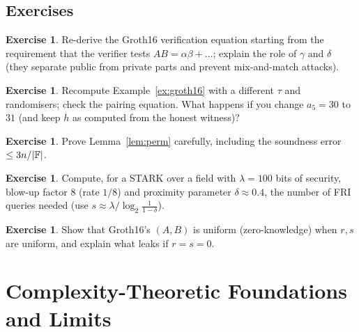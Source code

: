 \documentclass[11pt,a4paper]{report}
\theoremstyle{plain}
\theoremstyle{definition}
\newtheorem{exercise}[theorem]{Exercise}
\theoremstyle{remark}
\begin{document}
\section*{Exercises}
\begin{exercise}
Re-derive the Groth16 verification equation starting from the requirement that the verifier tests $AB=\alpha\beta+\ldots$; explain the role of $\gamma$ and $\delta$ (they separate public from private parts and prevent mix-and-match attacks).
\end{exercise}
\begin{exercise}
Recompute Example~\ref{ex:groth16} with a different $\tau$ and randomisers; check the pairing equation. What happens if you change $a_5=30$ to $31$ (and keep $h$ as computed from the honest witness)?
\end{exercise}
\begin{exercise}
Prove Lemma~\ref{lem:perm} carefully, including the soundness error $\le 3n/|\mathbb{F}|$.
\end{exercise}
\begin{exercise}\label{ex:starkq}
Compute, for a STARK over a field with $\lambda=100$ bits of security, blow-up factor $8$ (rate $1/8$) and proximity parameter $\delta\approx0.4$, the number of FRI queries needed (use $s\approx\lambda/\log_2\frac1{1-\delta}$).
\end{exercise}
\begin{exercise}
Show that Groth16's $(A,B)$ is uniform (zero-knowledge) when $r,s$ are uniform, and explain what leaks if $r=s=0$.
\end{exercise}

\chapter{Complexity-Theoretic Foundations and Limits}
\label{ch:theory}
\end{document}
